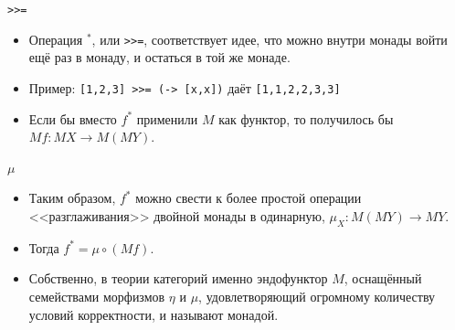 \documentclass[xcolor=dvipsnames]{beamer}
\begin{document}
\begin{frame}{{\tt {>}>=}}
\begin{itemize}[<+->]
 \item Операция $^*$, или {\tt {>}>=}, соответствует идее, что можно внутри монады войти ещё раз в монаду, и остаться в той же монаде.
 \item Пример: \texttt{[1,2,3] >>= (\x -> [x,x])} даёт \texttt{[1,1,2,2,3,3]}
 \item Если бы вместо $f^*$ применили $M$ как функтор, то получилось бы $Mf \colon MX \to M(MY)$.
 
 \begin{center}
\end{center}

\end{itemize}
\end{frame}

\begin{frame}{$\mu$}

\begin{itemize}[<+->]
 \item Таким образом,  $f^*$ можно свести к более простой операции <<разглаживания>> двойной монады в одинарную, $\mu_X \colon M(MY) \to MY$.
 \item Тогда $f^* = \mu \circ (M f)$.
 \item Собственно, в теории категорий именно эндофунктор $M$, оснащённый семействами морфизмов $\eta$ и $\mu$, удовлетворяющий огромному количеству условий корректности, и называют монадой.
\end{itemize}

\end{frame}
\end{document}
